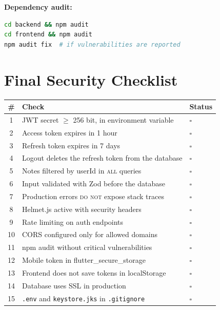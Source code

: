 \textbf{Dependency audit:}
\begin{lstlisting}[language=bash]
cd backend && npm audit
cd frontend && npm audit
npm audit fix  # if vulnerabilities are reported
\end{lstlisting}

\section{Final Security Checklist}

\begin{praticabox}[title={Practice --- Full verification}]
\begin{center}
\begin{small}
\begin{tabularx}{\textwidth}{c l X}
\toprule
\textbf{\#} & \textbf{Check} & \textbf{Status} \\
\midrule
1 & JWT secret $\geq$ 256 bit, in environment variable & $\square$ \\
2 & Access token expires in 1 hour & $\square$ \\
3 & Refresh token expires in 7 days & $\square$ \\
4 & Logout deletes the refresh token from the database & $\square$ \\
5 & Notes filtered by userId in \textsc{all} queries & $\square$ \\
6 & Input validated with Zod before the database & $\square$ \\
7 & Production errors \textsc{do not} expose stack traces & $\square$ \\
8 & Helmet.js active with security headers & $\square$ \\
9 & Rate limiting on auth endpoints & $\square$ \\
10 & CORS configured only for allowed domains & $\square$ \\
11 & npm audit without critical vulnerabilities & $\square$ \\
12 & Mobile token in flutter\_secure\_storage & $\square$ \\
13 & Frontend does not save tokens in localStorage & $\square$ \\
14 & Database uses SSL in production & $\square$ \\
15 & \texttt{.env} and \texttt{keystore.jks} in \texttt{.gitignore} & $\square$ \\
\bottomrule
\end{tabularx}
\end{small}
\end{center}
\end{praticabox}

